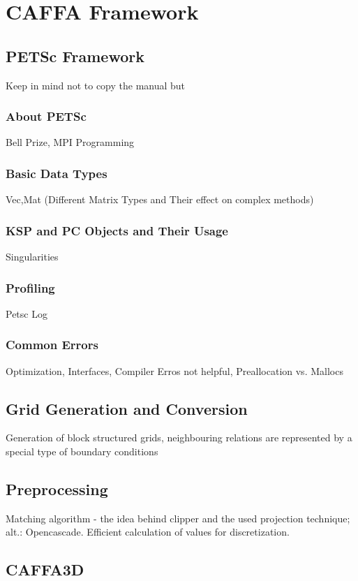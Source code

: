 \documentclass[article,type=msc,colorback,accentcolor=tud2a]{tudthesis}
\begin{document}
  \section{CAFFA Framework}

    \subsection{PETSc Framework}
      Keep in mind not to copy the manual but
      \subsubsection{About PETSc}
        Bell Prize, MPI Programming
      \subsubsection{Basic Data Types}
        Vec,Mat (Different Matrix Types and Their effect on complex methods)
      \subsubsection{KSP and PC Objects and Their Usage}
        Singularities
      \subsubsection{Profiling}
        Petsc Log 
      \subsubsection{Common Errors}
        Optimization, Interfaces, Compiler Erros not helpful, Preallocation vs. Mallocs

    \subsection{Grid Generation and Conversion}
    Generation of block structured grids, neighbouring relations are represented by a special type of boundary conditions
    \subsection{Preprocessing}
    Matching algorithm - the idea behind clipper and the used projection technique; alt.: Opencascade. Efficient calculation of values for discretization.
    \subsection{CAFFA3D}
\end{document}
